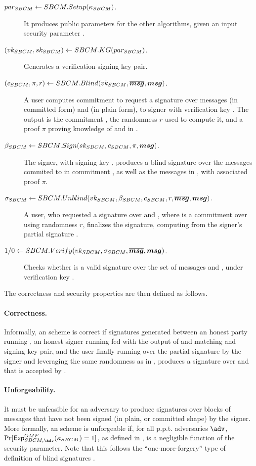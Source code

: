 \begin{description}
\item[$par_{SBCM} \gets SBCM.Setup(\kappa_{SBCM})$.] It produces public parameters
  for the other algorithms, given an input security parameter \SBCMsecpar.
\item[$(vk_{SBCM},sk_{SBCM}) \gets SBCM.KG(par_{SBCM})$.] Generates a
  verification-signing key pair.
\item[$(c_{SBCM},\pi,r) \gets SBCM.Blind(vk_{SBCM},\overline{\boldsymbol{msg}},\boldsymbol{msg})$.] A user
  computes commitment \SBCMcom to request a signature over messages \osmsg (in
  committed form) and \smsg (in plain form), to signer with verification key
  \SBCMvk. The output is the commitment \SBCMcom, the randomness $r$ used to
  compute it, and a proof $\pi$ proving knowledge of \osmsg and \smsg in
  \SBCMcom.
\item[$\beta_{SBCM} \gets SBCM.Sign(sk_{SBCM},c_{SBCM},\pi,\boldsymbol{msg})$.] The
  signer, with signing key \SBCMsk, produces a blind signature \SBCMbsig over
  the messages commited to in commitment \SBCMcom, as well as the messages in
  \smsg, with associated proof $\pi$.
\item[$\sigma_{SBCM} \gets SBCM.Unblind(vk_{SBCM},\beta_{SBCM},c_{SBCM},r,\overline{\boldsymbol{msg}},\boldsymbol{msg})$.]
  A user, who requested a signature over \osmsg and \smsg, where \SBCMcom is a
  commitment over \osmsg using randomness $r$, finalizes the signature,
  computing \SBCMsig from the signer's partial signature \SBCMbsig.
\item[$1/0 \gets SBCM.Verify(vk_{SBCM},\sigma_{SBCM},\overline{\boldsymbol{msg}},\boldsymbol{msg})$.] Checks
  whether \SBCMsig is a valid signature over the set of messages \osmsg and
  \smsg, under verification key \SBCMvk.
\end{description}

The correctness and security properties are then defined as follows.

\paragraph{Correctness.} %
Informally, an \SBCM scheme is correct if signatures generated between an honest
party running \SBCMBlind, an honest signer running \SBCMSign fed with the output
of \SBCMBlind and matching \smsg and signing key pair, and the user finally
running \SBCMUnblind over the partial signature by the signer and leveraging
the same randomness as in \SBCMBlind, produces a signature over \osmsg and \smsg
that is accepted by \SBCMVerify. 

\paragraph{Unforgeability.} %
It must be unfeasible for an adversary to produce signatures over blocks of
messages that have not been signed (in plain, or committed shape) by the
signer. More formally, an \SBCM scheme is unforgeable if, for all p.p.t.
adversaries $\adv$, $\Pr[\ExpSBCMOMF(\SBCMsecpar) = 1]$, as defined in
, is a negligible function of the security parameter.
Note that this follows the ``one-more-forgery'' type of definition of blind
signatures \cite{bold02}.

